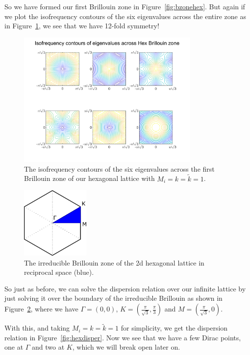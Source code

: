 So we have formed our first Brillouin zone in Figure~\ref{fig:bzonehex}. But
again if we plot the isofrequency contours of the six eigenvalues across the
entire zone as in Figure~\ref{fig:hexisofreq}, we see that we have 12-fold
symmetry!

\begin{figure}[!h]
\centering
\includegraphics[width=0.8\textwidth]{imgs/hexisofreq.png}
\caption{\label{fig:hexisofreq} The isofrequency contours of the six
  eigenvalues across the first Brillouin zone of our hexagonal lattice with
  $M_i=k=\tilde{k}=1$.}
\end{figure}

\begin{figure}[!h]
\centering
\includegraphics[width=0.3\textwidth]{imgs/hexibz.png}
\caption{\label{fig:ibzonehex} The irreducible Brillouin zone of the 2d
    hexagonal lattice in reciprocal space (blue).}
\end{figure}

So just as before, we can solve the dispersion relation over our infinite lattice
by just solving it over the boundary of the irreducible Brillouin as shown in
Figure~\ref{fig:ibzonehex}, where we have $\Gamma=(0,0)$,
$K=(\frac{\pi}{\sqrt{3}},\frac{\pi}{3})$ and $M=(\frac{\pi}{\sqrt{3}},0)$.

With this, and taking $M_i=k=\tilde{k}=1$ for simplicity, we get the dispersion
relation in Figure~\ref{fig:hexdisper}. Now we see that we have a few Dirac
points, one at $\Gamma$ and two at $K$, which we will break open later on.

